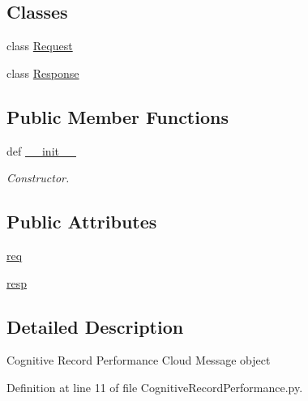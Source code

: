 \subsection*{Classes}
\begin{DoxyCompactItemize}
\item 
class \hyperlink{classRappCloud_1_1CloudMsgs_1_1CognitiveRecordPerformance_1_1CognitiveRecordPerformance_1_1Request}{Request}
\item 
class \hyperlink{classRappCloud_1_1CloudMsgs_1_1CognitiveRecordPerformance_1_1CognitiveRecordPerformance_1_1Response}{Response}
\end{DoxyCompactItemize}
\subsection*{Public Member Functions}
\begin{DoxyCompactItemize}
\item 
def \hyperlink{classRappCloud_1_1CloudMsgs_1_1CognitiveRecordPerformance_1_1CognitiveRecordPerformance_a635dfd303b05ab04f14ff7eca6d6188d}{\-\_\-\-\_\-init\-\_\-\-\_\-}
\begin{DoxyCompactList}\small\item\em Constructor. \end{DoxyCompactList}\end{DoxyCompactItemize}
\subsection*{Public Attributes}
\begin{DoxyCompactItemize}
\item 
\hyperlink{classRappCloud_1_1CloudMsgs_1_1CognitiveRecordPerformance_1_1CognitiveRecordPerformance_a4b3920d8b030af458e45538bfb626c6f}{req}
\item 
\hyperlink{classRappCloud_1_1CloudMsgs_1_1CognitiveRecordPerformance_1_1CognitiveRecordPerformance_a8aa9c2a274a3479225761ef354c04777}{resp}
\end{DoxyCompactItemize}


\subsection{Detailed Description}
\begin{DoxyVerb}Cognitive Record Performance Cloud Message object \end{DoxyVerb}
 

Definition at line 11 of file Cognitive\-Record\-Performance.\-py.



